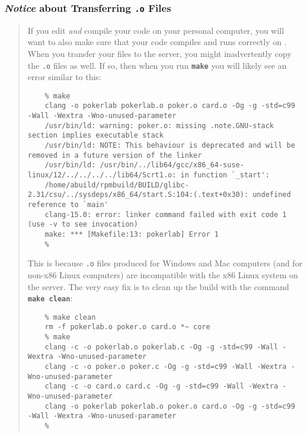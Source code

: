 \subsubsection*{\textit{Notice} about Transferring \texttt{.o} Files}
\begin{quote}

If you edit \textit{and} compile your code on your personal computer, you will want to also  make sure that your code compiles and runs correctly on \runtimeenvironment.
When you transfer your files to the server, you might inadvertently copy the \texttt{.o} files as well.
If so, then when you run \texttt{\textbf{make}} you will likely see an error similar to this:
\begin{verbatim}
    % make
    clang -o pokerlab pokerlab.o poker.o card.o -Og -g -std=c99 -Wall -Wextra -Wno-unused-parameter
    /usr/bin/ld: warning: poker.o: missing .note.GNU-stack section implies executable stack
    /usr/bin/ld: NOTE: This behaviour is deprecated and will be removed in a future version of the linker
    /usr/bin/ld: /usr/bin/../lib64/gcc/x86_64-suse-linux/12/../../../../lib64/Scrt1.o: in function `_start':
    /home/abuild/rpmbuild/BUILD/glibc-2.31/csu/../sysdeps/x86_64/start.S:104:(.text+0x30): undefined reference to `main'
    clang-15.0: error: linker command failed with exit code 1 (use -v to see invocation)
    make: *** [Makefile:13: pokerlab] Error 1
    %
\end{verbatim}

This is because \texttt{.o} files produced for Windows and Mac computers (and for non-x86 Linux computers) are incompatible with the x86 Linux system on the server.
The very easy fix is to clean up the build with the command \texttt{\textbf{make clean}}:
\begin{verbatim}
    % make clean
    rm -f pokerlab.o poker.o card.o *~ core
    % make
    clang -c -o pokerlab.o pokerlab.c -Og -g -std=c99 -Wall -Wextra -Wno-unused-parameter
    clang -c -o poker.o poker.c -Og -g -std=c99 -Wall -Wextra -Wno-unused-parameter
    clang -c -o card.o card.c -Og -g -std=c99 -Wall -Wextra -Wno-unused-parameter
    clang -o pokerlab pokerlab.o poker.o card.o -Og -g -std=c99 -Wall -Wextra -Wno-unused-parameter
    %
\end{verbatim}
\end{quote}
